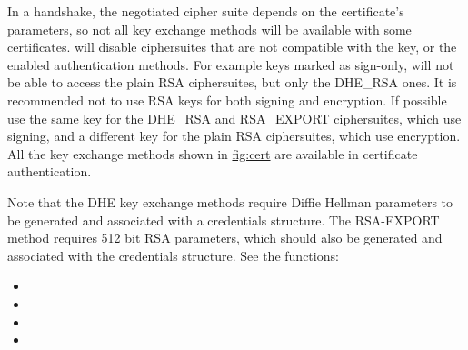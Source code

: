 \par
In a handshake, the negotiated cipher suite depends on the 
certificate's parameters, so not all key exchange methods will be available
with some certificates. \gnutls{} will disable ciphersuites that are not compatible with the key, or
the enabled authentication methods. For example keys marked as sign-only, will not be able to
access the plain RSA ciphersuites, but only the DHE\_RSA ones. It is
recommended not to use RSA keys for both signing and encryption. If possible
use the same key for the DHE\_RSA and RSA\_EXPORT ciphersuites, which use signing,
and a different key for the plain RSA ciphersuites, which use encryption.
All the key exchange methods shown in \hyperref{figure}{figure }{}{fig:cert} are
available in certificate authentication. 

Note that the DHE key exchange methods require Diffie Hellman parameters
to be generated and associated with a credentials structure. The RSA-EXPORT
method requires 512 bit RSA parameters, which should also be generated
and associated with the credentials structure. See the functions:
\begin{itemize}
\item {}
\item {}
\item {}
\item {}
\end{itemize}


